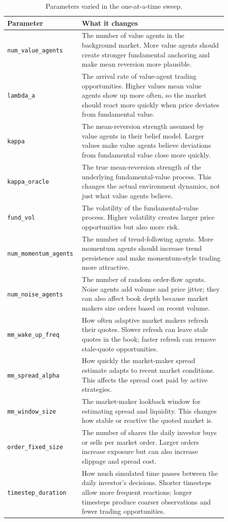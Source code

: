 \documentclass[11pt]{article}
\begin{document}
\begin{table}[H]
\centering
\small
\begin{tabular}{p{0.26\linewidth}p{0.64\linewidth}}
\toprule
Parameter & What it changes \\
\midrule
\texttt{num\_value\_agents} &
The number of value agents in the background market. More value agents should
create stronger fundamental anchoring and make mean reversion more plausible. \\
\texttt{lambda\_a} &
The arrival rate of value-agent trading opportunities. Higher values mean value
agents show up more often, so the market should react more quickly when price
deviates from fundamental value. \\
\texttt{kappa} &
The mean-reversion strength assumed by value agents in their belief model.
Larger values make value agents believe deviations from fundamental value close
more quickly. \\
\texttt{kappa\_oracle} &
The true mean-reversion strength of the underlying fundamental-value process.
This changes the actual environment dynamics, not just what value agents
believe. \\
\texttt{fund\_vol} &
The volatility of the fundamental-value process. Higher volatility creates
larger price opportunities but also more risk. \\
\texttt{num\_momentum\_agents} &
The number of trend-following agents. More momentum agents should increase
trend persistence and make momentum-style trading more attractive. \\
\texttt{num\_noise\_agents} &
The number of random order-flow agents. Noise agents add volume and price
jitter; they can also affect book depth because market makers size orders based
on recent volume. \\
\texttt{mm\_wake\_up\_freq} &
How often adaptive market makers refresh their quotes. Slower refresh can leave
stale quotes in the book; faster refresh can remove stale-quote opportunities. \\
\texttt{mm\_spread\_alpha} &
How quickly the market-maker spread estimate adapts to recent market
conditions. This affects the spread cost paid by active strategies. \\
\texttt{mm\_window\_size} &
The market-maker lookback window for estimating spread and liquidity. This
changes how stable or reactive the quoted market is. \\
\texttt{order\_fixed\_size} &
The number of shares the daily investor buys or sells per market order. Larger
orders increase exposure but can also increase slippage and spread cost. \\
\texttt{timestep\_duration} &
How much simulated time passes between the daily investor's decisions. Shorter
timesteps allow more frequent reactions; longer timesteps produce coarser
observations and fewer trading opportunities. \\
\bottomrule
\end{tabular}
\caption{Parameters varied in the one-at-a-time sweep.}
\label{tab:sweep-parameter-glossary}
\end{table}
\end{document}
